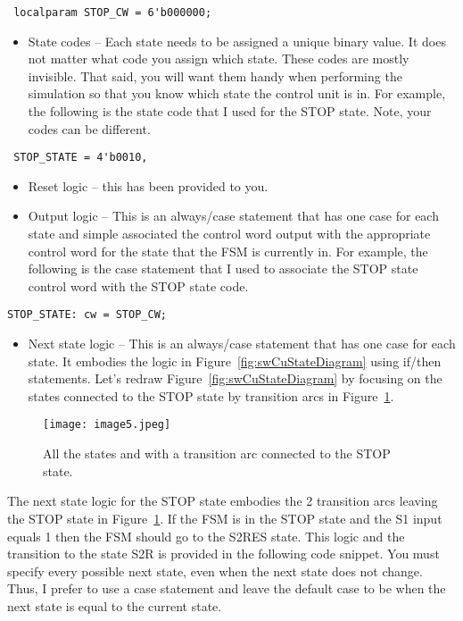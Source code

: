 \verb+ localparam STOP_CW = 6'b000000; +

\begin{itemize}
\item
  State codes -- Each state needs to be assigned a unique binary value.
  It does not matter what code you assign which state. These codes are
  mostly invisible. That said, you will want them handy when performing
  the simulation so that you know which state the control unit is in.
  For example, the following is the state code that I used for the STOP
  state. Note, your codes can be different.
\end{itemize}

\verb+ STOP_STATE = 4'b0010, +

\begin{itemize}
\item
  Reset logic -- this has been provided to you.
\item
  Output logic -- This is an always/case statement that has one case for
  each state and simple associated the control word output with the
  appropriate control word for the state that the FSM is currently in.
  For example, the following is the case statement that I used to
  associate the STOP state control word with the STOP state code.
\end{itemize}


\verb+STOP_STATE: cw = STOP_CW; +

\begin{itemize}
\item
  Next state logic -- This is an always/case statement that has one case
  for each state. It embodies the logic in Figure~\ref{fig:swCuStateDiagram} using if/then
  statements. Let's redraw Figure~\ref{fig:swCuStateDiagram} by focusing on the states connected
  to the STOP state by transition arcs in Figure~\ref{fig:swCuStopState}.
\end{itemize}

\begin{figure}[ht]
\texttt{[image: image5.jpeg]}
\caption{All the states and with a transition arc connected to the STOP state.}
\label{fig:swCuStopState}
\end{figure}


The next state logic for the STOP state embodies the 2 transition arcs
leaving the STOP state in Figure~\ref{fig:swCuStopState}. If the FSM is in the STOP state and
the S1 input equals 1 then the FSM should go to the S2RES state. This
logic and the transition to the state S2R is provided in the following
code snippet. You must specify every possible next state, even when the
next state does not change. Thus, I prefer to use a case statement and
leave the default case to be when the next state is equal to the current
state.

